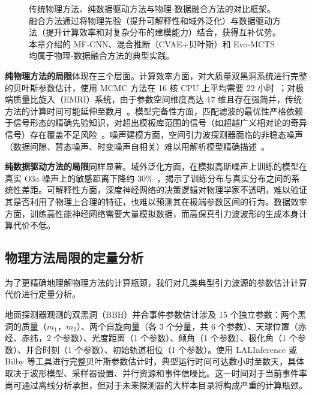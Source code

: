 \begin{figure}[htbp]
\caption{传统物理方法、纯数据驱动方法与物理-数据融合方法的对比框架。融合方法通过将物理先验（提升可解释性和域外泛化）与数据驱动方法（提升计算效率和对复杂分布的建模能力）结合，获得互补优势。本章介绍的 MF-CNN、混合推断（CVAE+贝叶斯）和 Evo-MCTS 均属于物理-数据融合方法的典型实践。}
\label{fig:fusion_paradigm}
\end{figure}

\textbf{纯物理方法的局限}体现在三个层面。计算效率方面，对大质量双黑洞系统进行完整的贝叶斯参数估计，使用 MCMC 方法在 16 核 CPU 上平均需要 22 小时~\cite{sun2025cvae}；对极端质量比旋入（EMRI）系统，由于参数空间维度高达 17 维且存在强简并，传统方法的计算时间可能延伸至数月~\cite{liang2024cnfemri}。模型完备性方面，匹配滤波的最优性严格依赖于信号形态的精确先验知识，对超出模板库范围的信号（如超越广义相对论的奇异信号）存在覆盖不足风险~\cite{wang2025beyondgr}。噪声建模方面，空间引力波探测器面临的非稳态噪声（数据间隙、暂态噪声、时变噪声自相关）难以用解析模型精确描述~\cite{xu2024nonstationarty}。

\textbf{纯数据驱动方法的局限}同样显著。域外泛化方面，在模拟高斯噪声上训练的模型在真实 O3a 噪声上的敏感距离下降约 30\%~\cite{schafer2023mlgwsc1}，揭示了训练分布与真实分布之间的系统性差距。可解释性方面，深度神经网络的决策逻辑对物理学家不透明，难以验证其是否利用了物理上合理的特征，也难以预测其在极端参数区间的行为。数据效率方面，训练高性能神经网络需要大量模拟数据，而高保真引力波波形的生成本身计算代价不低。

\subsection{物理方法局限的定量分析}

为了更精确地理解物理方法的计算瓶颈，我们对几类典型引力波源的参数估计计算代价进行定量分析。

地面探测器观测的双黑洞（BBH）并合事件参数估计涉及 15 个独立参数：两个黑洞的质量（$m_1$，$m_2$）、两个自旋向量（各 3 个分量，共 6 个参数）、天球位置（赤经、赤纬，2 个参数）、光度距离（1 个参数）、倾角（1 个参数）、极化角（1 个参数）、并合时刻（1 个参数）、初始轨道相位（1 个参数）。使用 LALInference 或 Bilby 等工具进行完整贝叶斯参数估计时，典型运行时间可达数小时至数天，具体取决于波形模型、采样器设置、并行资源和事件信噪比。这一时间对于当前事件率尚可通过离线分析承担，但对于未来探测器的大样本目录将构成严重的计算瓶颈。

